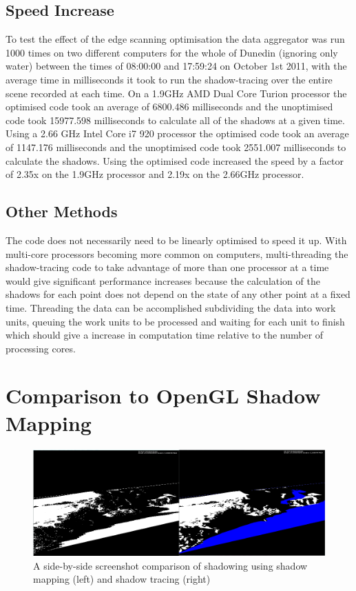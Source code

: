 \documentclass[12pt]{report}
\begin{document}
\subsection{Speed Increase}
To test the effect of the edge scanning optimisation the data aggregator was run 1000 times on two different computers for the whole of Dunedin (ignoring only water) between the times of 08:00:00 and 17:59:24 on October 1st 2011, with the average time in milliseconds it took to run the shadow-tracing over the entire scene recorded at each time. On a 1.9GHz AMD Dual Core Turion processor the optimised code took an average of 6800.486 milliseconds and the unoptimised code took 15977.598 milliseconds to calculate all of the shadows at a given time. Using a 2.66 GHz Intel Core i7 920 processor the optimised code took an average of 1147.176 milliseconds and the unoptimised code took 2551.007 milliseconds to calculate the shadows. Using the optimised code increased the speed by a factor of 2.35x on the 1.9GHz processor and 2.19x on the 2.66GHz processor.

\subsection{Other Methods}
The code does not necessarily need to be linearly optimised to speed it up. With multi-core processors becoming more common on computers, multi-threading the shadow-tracing code to take advantage of more than one processor at a time would give significant performance increases because the calculation of the shadows for each point does not depend on the state of any other point at a fixed time. Threading the data can be accomplished subdividing the data into work units, queuing the work units to be processed and waiting for each unit to finish which should give a increase in computation time relative to the number of processing cores.

\section{Comparison to OpenGL Shadow Mapping}
\begin{figure}[h]
\centering
\includegraphics[scale=0.6]{aggregatorvsshadowmapping.png}
\caption{A side-by-side screenshot comparison of shadowing using shadow mapping (left) and shadow tracing (right)}
\label{image:aggregatorvsshadowmapping}
\end{figure}
\end{document}

